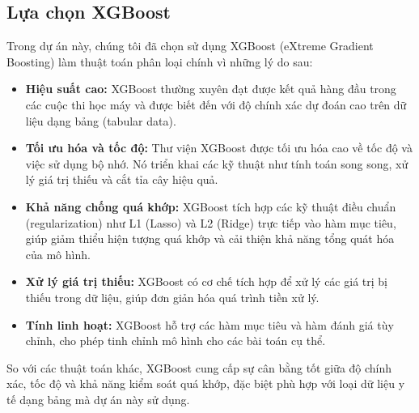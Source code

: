 \subsection{Lựa chọn XGBoost}

Trong dự án này, chúng tôi đã chọn sử dụng XGBoost (eXtreme Gradient Boosting) làm thuật toán phân loại chính vì những lý do sau:
\begin{itemize}
    \item \textbf{Hiệu suất cao:} XGBoost thường xuyên đạt được kết quả hàng đầu trong các cuộc thi học máy và được biết đến với độ chính xác dự đoán cao trên dữ liệu dạng bảng (tabular data).
    \item \textbf{Tối ưu hóa và tốc độ:} Thư viện XGBoost được tối ưu hóa cao về tốc độ và việc sử dụng bộ nhớ. Nó triển khai các kỹ thuật như tính toán song song, xử lý giá trị thiếu và cắt tỉa cây hiệu quả.
    \item \textbf{Khả năng chống quá khớp:} XGBoost tích hợp các kỹ thuật điều chuẩn (regularization) như L1 (Lasso) và L2 (Ridge) trực tiếp vào hàm mục tiêu, giúp giảm thiểu hiện tượng quá khớp và cải thiện khả năng tổng quát hóa của mô hình.
    \item \textbf{Xử lý giá trị thiếu:} XGBoost có cơ chế tích hợp để xử lý các giá trị bị thiếu trong dữ liệu, giúp đơn giản hóa quá trình tiền xử lý.
    \item \textbf{Tính linh hoạt:} XGBoost hỗ trợ các hàm mục tiêu và hàm đánh giá tùy chỉnh, cho phép tinh chỉnh mô hình cho các bài toán cụ thể.
\end{itemize}

So với các thuật toán khác, XGBoost cung cấp sự cân bằng tốt giữa độ chính xác, tốc độ và khả năng kiểm soát quá khớp, đặc biệt phù hợp với loại dữ liệu y tế dạng bảng mà dự án này sử dụng.

